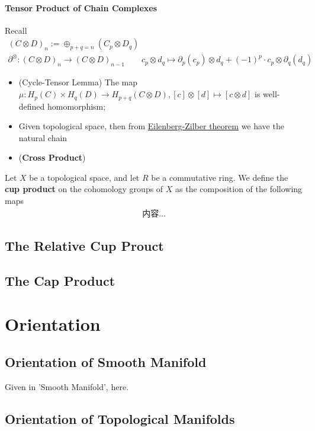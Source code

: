 \documentclass[Total.tex]{subfiles}
\begin{document}
				\subsubsection{Tensor Product of Chain Complexes}
					Recall
					\begin{gather*}
						(C\otimes D)_n:=\oplus_{p+q=n} (C_p\otimes D_q)\\
						\partial^\otimes:(C\otimes D)_n\rightarrow (C\otimes D)_{n-1}\qquad c_p\otimes d_q\mapsto \partial_p(c_p)\otimes d_q+(-1)^p\cdot c_p\otimes \partial_q(d_q)
					\end{gather*}
					\begin{Def}
						\begin{itemize}
							\item (Cycle-Tensor Lemma) The map $\mu:H_p(C)\times H_q(D)\rightarrow H_{p+q}(C\otimes D),[c]\otimes [d]\mapsto [c\otimes d]$ is well-defined homomorphism;
							\item Given topological space, then from \underline{Eilenberg-Zilber theorem} we have the natural chain 
							\item (\textbf{Cross Product})
						\end{itemize}
					\end{Def}
					\begin{Def}
						Let $X$ be a topological space, and let $R$ be a commutative ring. We define the \textbf{cup product} on the cohomology groups of $X$ as the composition of the following maps
						\begin{gather*}
							内容...
						\end{gather*}
					\end{Def}
			\section{The Relative Cup Prouct}
			\section{The Cap Product}
		\chapter{Orientation}
			\section{Orientation of Smooth Manifold}	
				Given in 'Smooth Manifold', here.
			\section{Orientation of Topological Manifolds}
\end{document}
